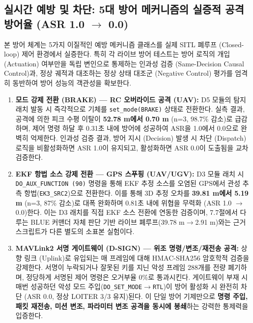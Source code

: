 \subsection{실시간 예방 및 차단: 5대 방어 메커니즘의 실증적 공격 방어율 (ASR 1.0 $\to$ 0.0)}

본 방어 체계는 5가지 이질적인 예방 메커니즘 클래스를 실제 SITL 폐루프 (Closed-loop) 제어 환경에서 실증한다. 특히 각 라이브 방어 테스트는 방어 로직의 개입 (Actuation) 여부만을 독립 변인으로 통제하는 인과성 검증 (Same-Decision Causal Control)과, 정상 궤적과 대조하는 정상 상태 대조군 (Negative Control) 평가를 엄격히 동반하여 방어 성능의 객관성을 확보한다.

\begin{enumerate}[leftmargin=*]
    \item \textbf{모드 강제 전환 (BRAKE) --- RC 오버라이드 공격 (UAV):} 
    D5 모듈의 탐지 래치 발동 시 즉각적으로 기체를 \texttt{set\_mode(BRAKE)} 상태로 전환한다. 실측 결과, 공격에 의한 피크 수평 이탈이 \textbf{52.78 m에서 0.70 m} (n=3, 98.7\% 감소)로 급감하며, 제어 명령 하달 후 0.31초 내에 방어에 성공하여 ASR을 1.0에서 0.0으로 완벽히 억제한다. 인과성 검증 결과, 방어 지시 (Decision) 발생 시 차단 (Dispatch) 로직을 비활성화하면 ASR 1.0이 유지되고, 활성화하면 ASR 0.0이 도출됨을 교차 검증한다.

    \item \textbf{EKF 항법 소스 강제 전환 --- GPS 스푸핑 (UAV/UGV):} 
    D3 모듈 래치 시 \texttt{DO\_AUX\_FUNCTION (90)} 명령을 통해 EKF 추정 소스를 오염된 GPS에서 관성 추측 항법(\texttt{EK3\_SRC2})으로 전환한다. 이를 통해 3D 추정 오차를 \textbf{39.81 m에서 5.19 m} (n=3, 87\% 감소)로 대폭 완화하며 0.81초 내에 위협을 무력화 (ASR 1.0 $\to$ 0.0)한다. 이는 D3 래치를 직접 EKF 소스 전환에 연동한 검증이며, 7.7절에서 다루는 BLUE 커맨더 자체 판단 기반 라이브 폐루프(39.78 m$\to$2.91 m)와는 근거 스크립트가 다른 별도의 소표본 실험이다.

    \item \textbf{MAVLink2 서명 게이트웨이 (D-SIGN) --- 위조 명령/변조/재전송 공격:} 
    상향 링크 (Uplink)로 유입되는 매 프레임에 대해 HMAC-SHA256 암호학적 검증을 강제한다. 서명이 누락되거나 잘못된 키를 지닌 악성 프레임 288개를 전량 폐기하며, 정당하게 서명된 제어 명령은 오거부율 0\%로 통과시킨다. 게이트웨이 부재 시 매번 성공하던 악성 모드 주입(\texttt{DO\_SET\_MODE$\to$RTL})이 방어 활성화 시 완전히 차단 (ASR 0.0, 정상 LOITER 3/3 유지)된다. 이 단일 방어 기제만으로 \textbf{명령 주입, 패킷 재전송, 미션 변조, 파라미터 변조 공격을 동시에 봉쇄}하는 강력한 통제력을 입증한다.


\end{enumerate}
